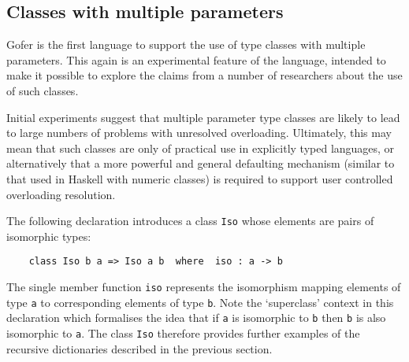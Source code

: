 \subsection{Classes with multiple parameters}
Gofer is the first language to support the use  of  type  classes  with
multiple parameters.  This again is  an  experimental  feature  of  the
language, intended to make it possible to explore  the  claims  from  a
number of researchers about the use of such classes.

Initial experiments suggest that multiple parameter  type  classes  are
likely  to  lead  to  large  numbers  of   problems   with   unresolved
overloading.  Ultimately, this may mean that such classes are  only  of
practical use in explicitly typed languages, or  alternatively  that  a
more powerful and general defaulting mechanism (similar to that used in
Haskell with numeric classes) is required to  support  user  controlled
overloading resolution.

The following declaration introduces a class  \verb"Iso"  whose  elements  are
pairs of isomorphic types:
\begin{verbatim}
    class Iso b a => Iso a b  where  iso : a -> b
\end{verbatim}
The single member function \verb"iso"  represents  the  isomorphism  mapping
elements of type \verb"a" 
to corresponding  elements  of  type  \verb"b".   Note  the
`superclass' context in this declaration which formalises the idea that
if \verb"a" is isomorphic to \verb"b" 
then \verb"b" is also isomorphic to \verb"a".  The class  \verb"Iso"
therefore provides  further  examples  of  the  recursive  dictionaries
described in the previous section.

